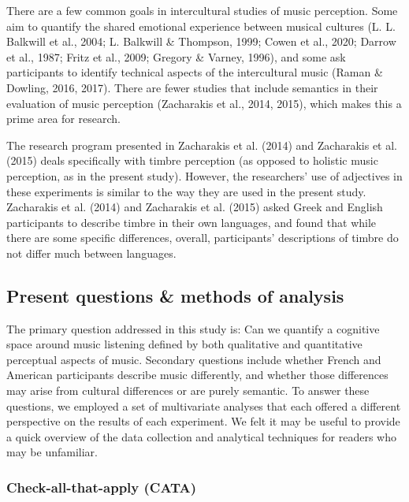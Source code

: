\documentclass[
  english,
  man,floatsintext]{apa6}
\begin{document}
There are a few common goals in intercultural studies of music perception. Some aim to quantify the shared emotional experience between musical cultures (L. L. Balkwill et al., 2004; L. Balkwill \& Thompson, 1999; Cowen et al., 2020; Darrow et al., 1987; Fritz et al., 2009; Gregory \& Varney, 1996), and some ask participants to identify technical aspects of the intercultural music (Raman \& Dowling, 2016, 2017). There are fewer studies that include semantics in their evaluation of music perception (Zacharakis et al., 2014, 2015), which makes this a prime area for research.

The research program presented in Zacharakis et al. (2014) and Zacharakis et al. (2015) deals specifically with timbre perception (as opposed to holistic music perception, as in the present study). However, the researchers' use of adjectives in these experiments is similar to the way they are used in the present study. Zacharakis et al. (2014) and Zacharakis et al. (2015) asked Greek and English participants to describe timbre in their own languages, and found that while there are some specific differences, overall, participants' descriptions of timbre do not differ much between languages.

\hypertarget{present-questions-methods-of-analysis}{%
\subsection{Present questions \& methods of analysis}\label{present-questions-methods-of-analysis}}

The primary question addressed in this study is: Can we quantify a cognitive space around music listening defined by both qualitative and quantitative perceptual aspects of music. Secondary questions include whether French and American participants describe music differently, and whether those differences may arise from cultural differences or are purely semantic. To answer these questions, we employed a set of multivariate analyses that each offered a different perspective on the results of each experiment. We felt it may be useful to provide a quick overview of the data collection and analytical techniques for readers who may be unfamiliar.

\hypertarget{check-all-that-apply-cata}{%
\subsubsection{Check-all-that-apply (CATA)}\label{check-all-that-apply-cata}}
\end{document}
